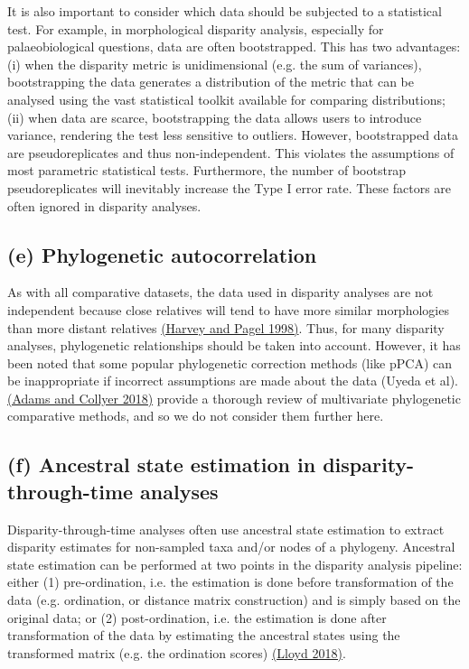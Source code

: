 It is also important to consider which data should be subjected to a
statistical test. For example, in morphological disparity analysis,
especially for palaeobiological questions, data are often bootstrapped.
This has two advantages: (i) when the disparity metric is unidimensional
(e.g. the sum of variances), bootstrapping the data generates a
distribution of the metric that can be analysed using the vast
statistical toolkit available for comparing distributions; (ii) when
data are scarce, bootstrapping the data allows users to introduce
variance, rendering the test less sensitive to outliers. However,
bootstrapped data are pseudoreplicates and thus non-independent. This
violates the assumptions of most parametric statistical tests.
Furthermore, the number of bootstrap pseudoreplicates will inevitably
increase the Type I error rate. These factors are often ignored in
disparity analyses.

\hypertarget{e-phylogenetic-autocorrelation}{%
\subsection{(e) Phylogenetic
autocorrelation}\label{e-phylogenetic-autocorrelation}}

As with all comparative datasets, the data used in disparity analyses
are not independent because close relatives will tend to have more
similar morphologies than more distant relatives
\href{https://paperpile.com/c/sTGYvp/WXik}{(Harvey and Pagel 1998)}.
Thus, for many disparity analyses, phylogenetic relationships should be
taken into account. However, it has been noted that some popular
phylogenetic correction methods (like pPCA) can be inappropriate if
incorrect assumptions are made about the data (Uyeda et al).
\href{https://paperpile.com/c/sTGYvp/ZnDd}{(Adams and Collyer 2018)}
provide a thorough review of multivariate phylogenetic comparative
methods, and so we do not consider them further here.

\hypertarget{f-ancestral-state-estimation-in-disparity-through-time-analyses}{%
\subsection{(f) Ancestral state estimation in disparity-through-time
analyses}\label{f-ancestral-state-estimation-in-disparity-through-time-analyses}}

Disparity-through-time analyses often use ancestral state estimation to
extract disparity estimates for non-sampled taxa and/or nodes of a
phylogeny. Ancestral state estimation can be performed at two points in
the disparity analysis pipeline: either (1) pre-ordination, i.e. the
estimation is done before transformation of the data (e.g. ordination,
or distance matrix construction) and is simply based on the original
data; or (2) post-ordination, i.e. the estimation is done after
transformation of the data by estimating the ancestral states using the
transformed matrix (e.g. the ordination scores)
\href{https://paperpile.com/c/sTGYvp/53SJ}{(Lloyd 2018)}.

